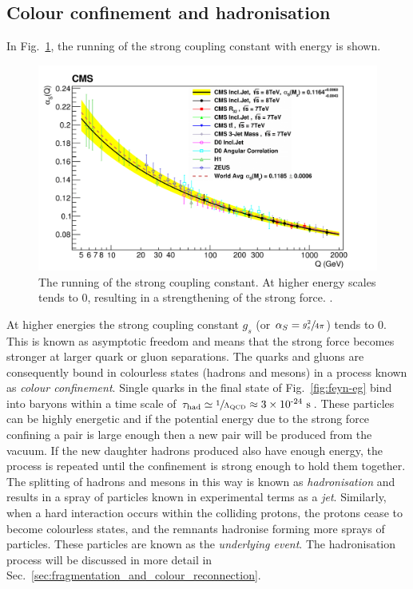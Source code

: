 \subsection{Colour confinement and hadronisation} %
\label{sub:confinement}
In Fig.~\ref{fig:alphaSrunning}, the running of the strong coupling constant with energy is shown.
\begin{figure}[h!]
	\centering
	\includegraphics[width=\textwidth]{Figures/alphaS}
	\caption[The running of the strong coupling constant. At higher energy scales \alpS{} tends to 0, resulting in a strengthening of the strong force.]{The running of the strong coupling constant. At higher energy scales \alpS{} tends to 0, resulting in a strengthening of the strong force. \cite{alphaSrunning}.}
	\label{fig:alphaSrunning}
\end{figure}
At higher energies the strong coupling constant $g_{s}$ (or $\alpha_S = \sfrac{g_{s}^{2}}{4\pi}$) tends to 0.
This is known as asymptotic freedom and means that the strong force becomes stronger at larger quark or gluon separations.
The quarks and gluons are consequently bound in colourless states (hadrons and mesons) in a process known as \textit{colour confinement}.
Single quarks in the final state of Fig.~\ref{fig:feyn-eg} bind into baryons within a time scale of $\tau_{\mathrm{had}} \simeq \sfrac{1}{\Lambda_{\mathrm{QCD}}} \approx 3\times \text{10}^\text{-24}\mathrm{~s}^{}$.
These particles can be highly energetic and if the potential energy due to the strong force confining a \qqbar{} pair is large enough then a new \qqbar{} pair will be produced from the vacuum. 
If the new daughter hadrons produced also have enough energy, the process is repeated until the confinement is strong enough to hold them together.
The splitting of hadrons and mesons in this way is known as \textit{hadronisation} and results in a spray of particles known in experimental terms as a \textit{jet}.
Similarly, when a hard interaction occurs within the colliding protons, the protons cease to become colourless states, and the remnants hadronise forming more sprays of particles.
These particles are known as the \textit{underlying event}.
The hadronisation process will be discussed in more detail in Sec.~\ref{sec:fragmentation_and_colour_reconnection}.



